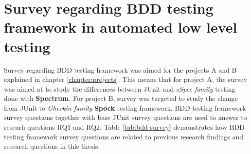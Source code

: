     \vspace{20px}
    \begin{table}[H]
            \caption {NPS questions of developer loyalty towards low level automated testing with JUnit} \label{tab:junit-pt3}

    \end{table}
    \clearpage
\restoregeometry






\section{Survey regarding BDD testing framework in automated low level testing}
\label{section:bdd-survey}
Survey regarding BDD testing framework was aimed for the projects A and B explained in chapter \ref{chapter:projects}. This means
that for project A, the survey was aimed at to study the differences between JUnit and \textit{xSpec family} testing done with \textbf{Spectrum}.
For project B, survey was targeted to study the change from JUnit to \textit{Gherkin family} \textbf{Spock} testing framework.
BDD testing framework survey questions together with base JUnit survey questions are used to answer to researh questions
RQ1 and RQ2. Table \ref{tab:bdd-survey} demonstrates how BDD testing framework survey questions are related to previous research findings
and research questions in this thesis:

